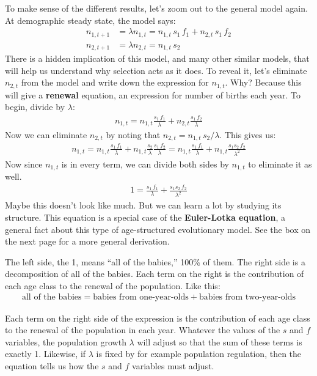 \documentclass[10pt,reqno]{amsbook}
\newcommand{\bemph}[1]{{\textbf{\textcolor{bemphcol}{#1}}}}
\numberwithin{equation}{chapter}
\begin{document}
To make sense of the different results, let's zoom out to the general model again. At demographic steady state, the model says:
\begin{align*}
	n_{1,t+1} &= \lambda n_{1,t} = n_{1,t} \, s_1 \, f_1   + n_{2,t} \, s_1 \, f_2 \\
	n_{2,t+1} &= \lambda n_{2,t} = n_{1,t} \, s_2 
\end{align*}
There is a hidden implication of this model, and many other similar models, that will help us understand why selection acts as it does. To reveal it, let's eliminate $n_{2,t}$ from the model and write down the expression for $n_{1,t}$. Why? Because this will give a \bemph{renewal} equation, an expression for number of births each year. To begin, divide by $\lambda$:
\begin{align*}
	n_{1,t} = n_{1,t} \frac{ s_1 \, f_1}{\lambda}   +  n_{2,t} \frac{ s_1 \, f_2}{\lambda}
\end{align*}
Now we can eliminate $n_{2,t}$ by noting that $n_{2,t}=n_{1,t} \, s_2 / \lambda$. This gives us:
\begin{align*}
	n_{1,t} = n_{1,t} \frac{ s_1 \, f_1}{\lambda}   +  n_{1,t} \frac{s_2}{\lambda} \frac{ s_1 \, f_2}{\lambda} = n_{1,t} \frac{ s_1 \, f_1}{\lambda}   +  n_{1,t} \frac{ s_1  s_2 \, f_2}{\lambda^2}
\end{align*}
Now since $n_{1,t}$ is in every term, we can divide both sides by $n_{1,t}$ to eliminate it as well. 
\begin{align*}
	1 = \frac{ s_1 \, f_1}{\lambda} +  \frac{ s_1  s_2 \, f_2}{\lambda^2}
\end{align*}
Maybe this doesn't look like much. But we can learn a lot by studying its structure. This equation is a special case of the \bemph{Euler-Lotka equation}, a general fact about this type of age-structured evolutionary model. See the box on the next page for a more general derivation. 

The left side, the 1, means ``all of the babies,'' 100\% of them. The right side is a decomposition of all of the babies. Each term on the right is the contribution of each age class to the renewal of the population. Like this:
\begin{align*}
	\text{all of the babies} = \text{babies from one-year-olds} + \text{babies from two-year-olds}
\end{align*}

Each term on the right side of the expression is the contribution of each age class to the renewal of the population in each year. Whatever the values of the $s$ and $f$ variables, the population growth $\lambda$ will adjust so that the sum of these terms is exactly 1. Likewise, if $\lambda$ is fixed by for example population regulation, then the equation tells us how the $s$ and $f$ variables must adjust. 
\end{document}

